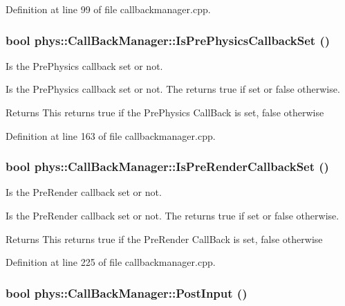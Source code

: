 Definition at line 99 of file callbackmanager.cpp.

\hypertarget{classphys_1_1CallBackManager_af93b7b96e85faa77ed005840e0189ebd}{
\subsubsection[{IsPrePhysicsCallbackSet}]{\setlength{\rightskip}{0pt plus 5cm}bool phys::CallBackManager::IsPrePhysicsCallbackSet ()}}
\label{d1/d47/classphys_1_1CallBackManager_af93b7b96e85faa77ed005840e0189ebd}


Is the PrePhysics callback set or not. 

Is the PrePhysics callback set or not. The returns true if set or false otherwise. \begin{DoxyReturn}{Returns}
This returns true if the PrePhysics CallBack is set, false otherwise 
\end{DoxyReturn}


Definition at line 163 of file callbackmanager.cpp.

\hypertarget{classphys_1_1CallBackManager_aa4eff76517403726c846911f6b97b2c2}{
\subsubsection[{IsPreRenderCallbackSet}]{\setlength{\rightskip}{0pt plus 5cm}bool phys::CallBackManager::IsPreRenderCallbackSet ()}}
\label{d1/d47/classphys_1_1CallBackManager_aa4eff76517403726c846911f6b97b2c2}


Is the PreRender callback set or not. 

Is the PreRender callback set or not. The returns true if set or false otherwise. \begin{DoxyReturn}{Returns}
This returns true if the PreRender CallBack is set, false otherwise 
\end{DoxyReturn}


Definition at line 225 of file callbackmanager.cpp.

\hypertarget{classphys_1_1CallBackManager_a83afb36cfc7e71863d68a8b4c1d5e9d2}{
\subsubsection[{PostInput}]{\setlength{\rightskip}{0pt plus 5cm}bool phys::CallBackManager::PostInput ()}}
\label{d1/d47/classphys_1_1CallBackManager_a83afb36cfc7e71863d68a8b4c1d5e9d2}


